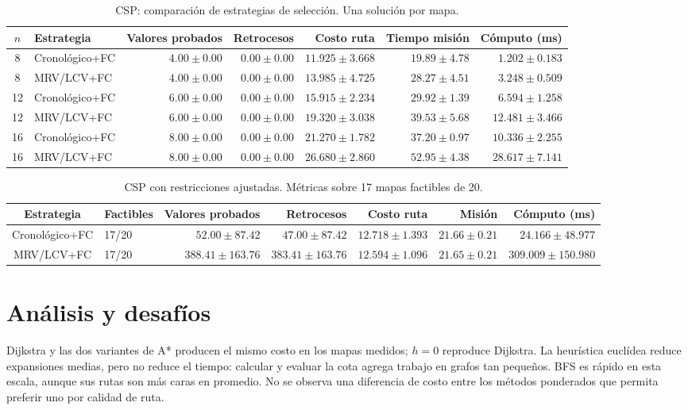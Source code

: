 \documentclass[10pt,spanish]{article}
\begin{document}
\begin{table}[H]
\centering
\caption{CSP: comparación de estrategias de selección. Una solución por mapa.}
\scriptsize
\begin{tabular}{clrrrrr}
\toprule
$n$ & Estrategia & Valores probados & Retrocesos & Costo ruta & Tiempo misión & Cómputo (ms) \\
\midrule
8 & Cronológico+FC & $4.00\pm0.00$ & $0.00\pm0.00$ & $11.925\pm3.668$ & $19.89\pm4.78$ & $1.202\pm0.183$ \\
8 & MRV/LCV+FC & $4.00\pm0.00$ & $0.00\pm0.00$ & $13.985\pm4.725$ & $28.27\pm4.51$ & $3.248\pm0.509$ \\
12 & Cronológico+FC & $6.00\pm0.00$ & $0.00\pm0.00$ & $15.915\pm2.234$ & $29.92\pm1.39$ & $6.594\pm1.258$ \\
12 & MRV/LCV+FC & $6.00\pm0.00$ & $0.00\pm0.00$ & $19.320\pm3.038$ & $39.53\pm5.68$ & $12.481\pm3.466$ \\
16 & Cronológico+FC & $8.00\pm0.00$ & $0.00\pm0.00$ & $21.270\pm1.782$ & $37.20\pm0.97$ & $10.336\pm2.255$ \\
16 & MRV/LCV+FC & $8.00\pm0.00$ & $0.00\pm0.00$ & $26.680\pm2.860$ & $52.95\pm4.38$ & $28.617\pm7.141$ \\
\bottomrule
\end{tabular}
\end{table}

\begin{table}[H]
\centering
\caption{CSP con restricciones ajustadas. Métricas sobre 17 mapas factibles de 20.}
\scriptsize
\begin{tabular}{clrrrrr}
\toprule
Estrategia & Factibles & Valores probados & Retrocesos & Costo ruta & Misión & Cómputo (ms) \\
\midrule
Cronológico+FC & 17/20 & $52.00\pm87.42$ & $47.00\pm87.42$ & $12.718\pm1.393$ & $21.66\pm0.21$ & $24.166\pm48.977$ \\
MRV/LCV+FC & 17/20 & $388.41\pm163.76$ & $383.41\pm163.76$ & $12.594\pm1.096$ & $21.65\pm0.21$ & $309.009\pm150.980$ \\
\bottomrule
\end{tabular}
\end{table}

\section{Análisis y desafíos}
Dijkstra y las dos variantes de A* producen el mismo costo en los mapas medidos; $h=0$ reproduce Dijkstra. La heurística euclídea reduce expansiones medias, pero no reduce el tiempo: calcular y evaluar la cota agrega trabajo en grafos tan pequeños. BFS es rápido en esta escala, aunque sus rutas son más caras en promedio. No se observa una diferencia de costo entre los métodos ponderados que permita preferir uno por calidad de ruta.
\end{document}
